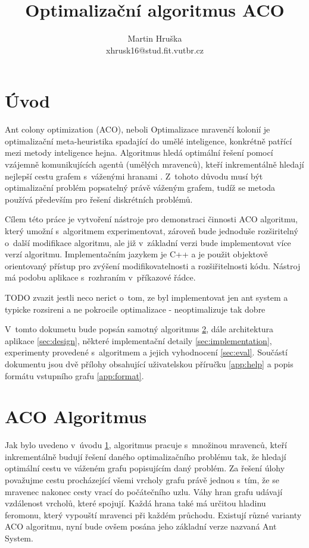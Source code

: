 \documentclass[a4paper, 12pt]{article}
\title{Optimalizační algoritmus ACO}
\author{Martin Hruška\\xhrusk16@stud.fit.vutbr.cz}
\date{}
\begin{document}
\maketitle

\section{Úvod}
\label{sec:intro}
Ant colony optimization (ACO), neboli Optimalizace mravenčí kolonií je optimalizační meta-heuristika spadající do umělé inteligence,
konkrétně patřící mezi metody inteligence hejna. Algoritmus hledá optimální řešení pomocí vzájemně komunikujících agentů (umělých mravenců), kteří
inkrementálně hledají nejlepší cestu grafem s~váženými hranami \cite{aco:main}. 
Z~tohoto důvodu musí být optimalizační problém popsatelný právě váženým grafem, tudíž se metoda používá především pro řešení diskrétních problémů.

Cílem této práce je vytvoření nástroje pro demonstraci činnosti ACO algoritmu, který umožní s~algoritmem experimentovat, zároveň bude jednoduše rozširitelný
o~další modifikace algoritmu, ale již v~základní verzi bude implementovat více verzí algoritmu. Implementačním jazykem je C++ a je použit objektově orientovaný
přístup pro zvýšení modifikovatelnosti a rozšiřitelnosti kódu. Nástroj má podobu aplikace s~rozhraním v~příkazové řádce.

TODO zvazit jestli neco nerict o~tom, ze byl implementovat jen ant system a typicke rozsireni a ne pokrocile optimalizace - neoptimalizuje tak dobre

V~tomto dokumetu bude popsán samotný algoritmus \ref{sec:algorithm}, dále architektura aplikace \ref{sec:design},
některé implementační detaily \ref{sec:implementation}, experimenty provedené s~algoritmem a jejich vyhodnocení \ref{sec:eval}.
Součástí dokumentu jsou dvě přílohy obsahující uživatelskou příručku \ref{app:help} a popis formátu vstupního grafu \ref{app:format}.

\section{ACO Algoritmus}
\label{sec:algorithm}
Jak bylo uvedeno v~úvodu \ref{sec:intro}, algoritmus pracuje s~množinou mravenců, kteří inkrementálně budují řešení daného optimalizačního problému tak, že
hledají optimální cestu ve váženém grafu popisujícím daný problém. Za řešení úlohy považujme cestu procházející všemi vrcholy grafu právě jednou s~tím, že se
mravenec nakonec cesty vrací do počátečního uzlu. Váhy hran grafu udávají vzdálenost vrcholů, které spojují. Každá hrana také má určitou hladinu feromonu, který
vypouští mravenci při každém průchodu. Existují různé varianty ACO algoritmu, nyní bude ovšem posána jeho základní verze nazvaná Ant System.
\end{document}

